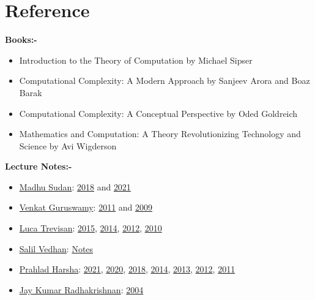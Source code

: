 \documentclass{article}
\begin{document}

\section{Reference}
\textbf{Books:-}
\begin{itemize}
	\item  Introduction to the Theory of Computation by Michael Sipser \cite{sipser13}
	\item Computational Complexity: A Modern Approach by Sanjeev Arora and Boaz Barak \cite{arora}
	\item Computational Complexity: A Conceptual Perspective by Oded Goldreich  \cite{oded}
	\item Mathematics and Computation: A Theory Revolutionizing Technology and Science by Avi Wigderson \cite{avi}
\end{itemize}
\textbf{Lecture Notes:-}
\begin{itemize}
	\item \href{https://madhu.seas.harvard.edu/}{Madhu Sudan}: \href{http://madhu.seas.harvard.edu/courses/Spring2018}{2018} and \href{http://madhu.seas.harvard.edu/courses/Spring2021}{2021}
	\item \href{https://people.eecs.berkeley.edu/~venkatg/}{Venkat Guruswamy}: \href{https://cmucomplexitytheory.wordpress.com/}{2011} and \href{https://www.cs.cmu.edu/~odonnell/complexity/}{2009}
	\item \href{https://lucatrevisan.github.io/}{Luca Trevisan}: \href{https://lucatrevisan.github.io/teaching/cs172-15/index.html}{2015}, \href{https://lucatrevisan.github.io/teaching/cs254/index.html}{2014}, \href{https://lucatrevisan.github.io/teaching/cs254-12/index.html}{2012}, \href{http://www.cs.stanford.edu/~trevisan/cs254-10/}{2010}
	\item \href{https://salil.seas.harvard.edu/}{Salil Vedhan}: \href{http://people.seas.harvard.edu/~salil/cs221/}{Notes}
	\item \href{https://www.tifr.res.in/~prahladh/}{Prahlad Harsha}: \href{https://www.tifr.res.in/~prahladh/teaching/2020-21/complexity/}{2021}, \href{https://www.tifr.res.in/~prahladh/teaching/2019-20/complexity/}{2020}, \href{https://www.tifr.res.in/~prahladh/teaching/2017-18/complexity/}{2018}, \href{https://www.tifr.res.in/~prahladh/teaching/2013-14/complexity/}{2014}, \href{https://www.tifr.res.in/~prahladh/teaching/2012-13/complexity/}{2013}, \href{https://www.tifr.res.in/~prahladh/teaching/2011-12/complexity/}{2012}, \href{https://www.tifr.res.in/~prahladh/teaching/2010-11/complexity/}{2011}
	\item \href{https://www.tcs.tifr.res.in/~jaikumar/}{Jay Kumar Radhakrishnan}: \href{https://www.tcs.tifr.res.in/~jaikumar/Courses/Complexity/}{2004}
\end{itemize}
\end{document}
